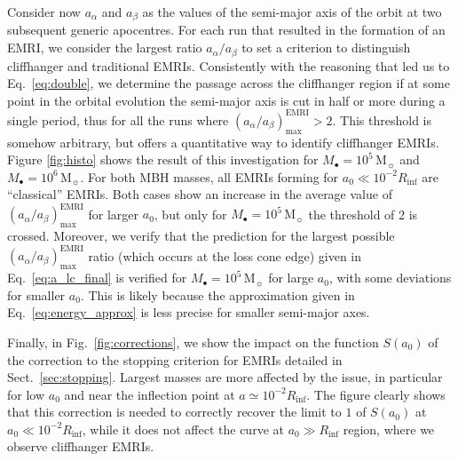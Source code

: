 \documentclass[desactivate]{aa}
\begin{document}
        Consider now $a_\alpha$ and $a_\beta$ as the values of the semi-major axis of the orbit at two subsequent generic apocentres. For each run that resulted in the formation of an EMRI, we consider the largest ratio $a_\alpha / a_\beta$ to set a criterion to distinguish cliffhanger and traditional EMRIs. Consistently with the reasoning that led us to Eq.\ \eqref{eq:double}, we determine the passage across the cliffhanger region if at some point in the orbital evolution the semi-major axis is cut in half or more during a single period, thus for all the runs where $(a_\alpha/a_\beta)_\mathrm{max}^\mathrm{EMRI} > 2$. This threshold is somehow arbitrary, but offers a quantitative way to identify cliffhanger EMRIs. Figure \ref{fig:histo} shows the result of this investigation for $M_\bullet = 10^5 \, \mathrm{M_\sun}$ and  $M_\bullet = 10^6 \, \mathrm{M_\sun}$. For both MBH masses, all EMRIs forming for $a_0 \ll 10^{-2} R_\mathrm{inf}$ are ``classical'' EMRIs. Both cases show an increase in the average value of $(a_\alpha/a_\beta)_\mathrm{max}^\mathrm{EMRI}$ for larger $a_0$, but only for $M_\bullet = 10^5 \, \mathrm{M_\sun}$ the threshold of 2 is crossed. Moreover, we verify that the prediction for the largest possible $(a_\alpha/a_\beta)_\mathrm{max}^\mathrm{EMRI}$ ratio (which occurs at the loss cone edge) given in Eq.\ \eqref{eq:a_lc_final} is verified for $M_\bullet = 10^5 \, \mathrm{M_\sun}$ for large $a_0$, with some deviations for smaller $a_0$. This is likely because the approximation given in Eq.\ \eqref{eq:energy_approx} is less precise for smaller semi-major axes.  
        
        Finally, in Fig.\ \ref{fig:corrections}, we show the impact on the function $S(a_0)$ of the correction to the stopping criterion for EMRIs detailed in Sect.\ \ref{sec:stopping}. Largest masses are more affected by the issue, in particular for low $a_0$ and near the inflection point at $a \simeq 10^{-2} R_\mathrm{inf}$. The figure clearly shows that this correction is needed to correctly recover the limit to $1$ of $S(a_0)$ at $a_0 \ll 10^{-2} R_\mathrm{inf}$, while it does not affect the curve at $a_0 \gg R_\mathrm{inf}$ region, where we observe cliffhanger EMRIs.  
\end{document}
